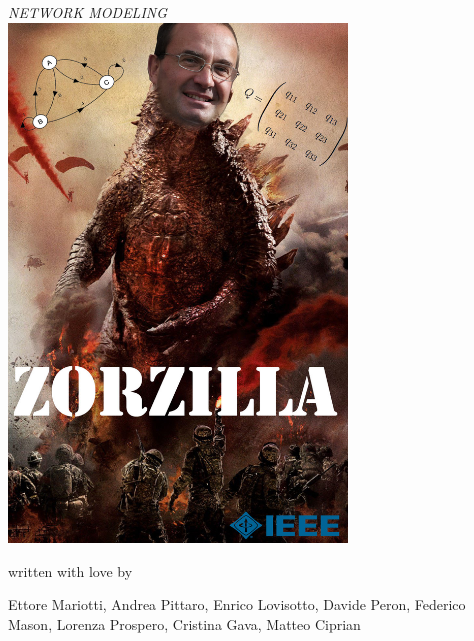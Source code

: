 \documentclass[a4paper, 12pt, twoside, openright, fleqn]{book}
\theoremstyle{theoremdd}
\theoremstyle{remark}
\begin{document}
\frontmatter

\begin{titlepage} %
\begin{center}


\hspace{0.5cm}

\emph{\Large{NETWORK MODELING}} \\
\vspace{1cm}
\includegraphics[width=9cm]{Zorzilla}\\
\vspace{0.5cm}
{written with love by\par}
{\Large Ettore Mariotti, Andrea Pittaro, Enrico Lovisotto, Davide Peron, Federico Mason, Lorenza Prospero, Cristina Gava, Matteo Ciprian\par}
\end{center}



\end{titlepage}
\end{document}
